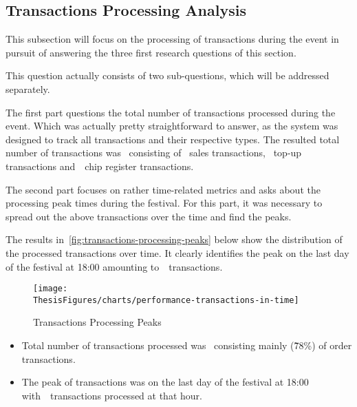 
\subsection{Transactions Processing Analysis}
\label{subsec:analysis-performance-indicators-transactions}

This subsection will focus on the processing of transactions during the event in pursuit of answering the three first research questions of this section.


This question actually consists of two sub-questions, which will be addressed separately.

The first part questions the total number of transactions processed during the event.
Which was actually pretty straightforward to answer, as the system was designed to track all transactions and their respective types.
The resulted total number of transactions was~ consisting of ~sales transactions, ~top-up transactions and~~chip register transactions.

The second part focuses on rather time-related metrics and asks about the processing peak times during the festival.
For this part, it was necessary to spread out the above transactions over the time and find the peaks.

The results in~\autoref{fig:transactions-processing-peaks} below show the distribution of the processed transactions over time.
It clearly identifies the peak on the last day of the festival at 18:00 amounting to~~transactions.

\begin{figure}[H]
	\centering
	\texttt{[image: \\ThesisFigures/charts/performance-transactions-in-time]}
	\caption{Transactions Processing Peaks}
	\label{fig:transactions-processing-peaks}
	\source
\end{figure}

\begin{keytakeaways}
	\begin{itemize}
		\item Total number of transactions processed was~ consisting mainly (7̃8\%) of order transactions.
		\item The peak of transactions was on the last day of the festival at 18:00 with~~transactions processed at that hour.
	\end{itemize}
\end{keytakeaways}

